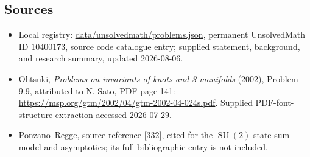 \documentclass[11pt]{article}
\begin{document}
\subsection{Sources}
\begin{itemize}
\item Local registry: \url{data/unsolvedmath/problems.json}, permanent UnsolvedMath ID \(10400173\), source code catalogue entry; supplied statement, background, and research summary, updated 2026-08-06.
\item Ohtsuki, \emph{Problems on invariants of knots and 3-manifolds} (2002), Problem 9.9, attributed to N. Sato, PDF page 141: \url{https://msp.org/gtm/2002/04/gtm-2002-04-024s.pdf}. Supplied PDF-font-structure extraction accessed 2026-07-29.
\item Ponzano--Regge, source reference [332], cited for the \(\operatorname{SU}(2)\) state-sum model and asymptotics; its full bibliographic entry is not included.
\end{itemize}
\end{document}
